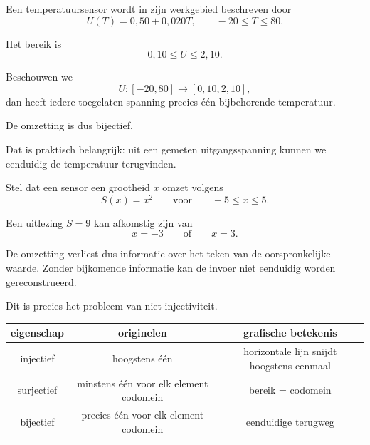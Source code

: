 \documentclass{ximera}
\begin{document}
\begin{voorbeeld}

Een temperatuursensor wordt in zijn werkgebied beschreven door
\[
U(T)=0{,}50+0{,}020T,
\qquad -20\leq T\leq80.
\]

Het bereik is
\[
0{,}10\leq U\leq2{,}10.
\]

Beschouwen we
\[
U:[-20,80]\to[0{,}10,2{,}10],
\]
dan heeft iedere toegelaten spanning precies één bijbehorende temperatuur.

De omzetting is dus bijectief.

Dat is praktisch belangrijk: uit een gemeten uitgangsspanning kunnen we
eenduidig de temperatuur terugvinden.

\begin{center}
\end{center}
\end{voorbeeld}

\begin{voorbeeld}

Stel dat een sensor een grootheid \(x\) omzet volgens
\[
S(x)=x^2
\qquad\text{voor}\qquad -5\leq x\leq5.
\]

Een uitlezing \(S=9\) kan afkomstig zijn van
\[
x=-3
\qquad\text{of}\qquad
x=3.
\]

De omzetting verliest dus informatie over het teken van de oorspronkelijke
waarde. Zonder bijkomende informatie kan de invoer niet eenduidig worden
gereconstrueerd.

Dit is precies het probleem van niet-injectiviteit.
\end{voorbeeld}



\begin{center}
\begin{tabular}{c|c|c}
\textbf{eigenschap} & \textbf{originelen} & \textbf{grafische betekenis}\\
\hline
injectief & hoogstens één & horizontale lijn snijdt hoogstens eenmaal\\
surjectief & minstens één voor elk element codomein & bereik = codomein\\
bijectief & precies één voor elk element codomein & eenduidige terugweg
\end{tabular}
\end{center}
\end{document}
